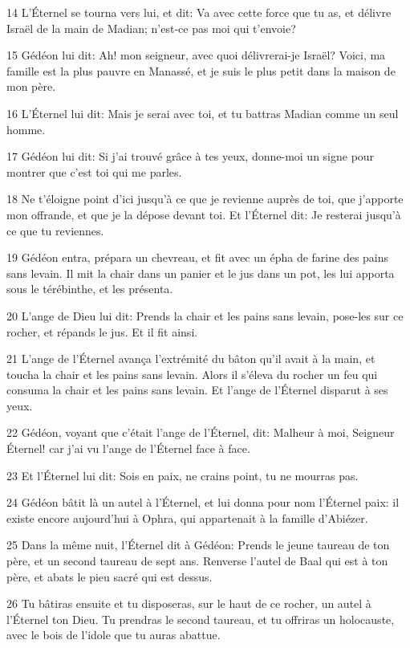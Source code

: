 \par 14 L'Éternel se tourna vers lui, et dit: Va avec cette force que tu as, et délivre Israël de la main de Madian; n'est-ce pas moi qui t'envoie?
\par 15 Gédéon lui dit: Ah! mon seigneur, avec quoi délivrerai-je Israël? Voici, ma famille est la plus pauvre en Manassé, et je suis le plus petit dans la maison de mon père.
\par 16 L'Éternel lui dit: Mais je serai avec toi, et tu battras Madian comme un seul homme.
\par 17 Gédéon lui dit: Si j'ai trouvé grâce à tes yeux, donne-moi un signe pour montrer que c'est toi qui me parles.
\par 18 Ne t'éloigne point d'ici jusqu'à ce que je revienne auprès de toi, que j'apporte mon offrande, et que je la dépose devant toi. Et l'Éternel dit: Je resterai jusqu'à ce que tu reviennes.
\par 19 Gédéon entra, prépara un chevreau, et fit avec un épha de farine des pains sans levain. Il mit la chair dans un panier et le jus dans un pot, les lui apporta sous le térébinthe, et les présenta.
\par 20 L'ange de Dieu lui dit: Prends la chair et les pains sans levain, pose-les sur ce rocher, et répands le jus. Et il fit ainsi.
\par 21 L'ange de l'Éternel avança l'extrémité du bâton qu'il avait à la main, et toucha la chair et les pains sans levain. Alors il s'éleva du rocher un feu qui consuma la chair et les pains sans levain. Et l'ange de l'Éternel disparut à ses yeux.
\par 22 Gédéon, voyant que c'était l'ange de l'Éternel, dit: Malheur à moi, Seigneur Éternel! car j'ai vu l'ange de l'Éternel face à face.
\par 23 Et l'Éternel lui dit: Sois en paix, ne crains point, tu ne mourras pas.
\par 24 Gédéon bâtit là un autel à l'Éternel, et lui donna pour nom l'Éternel paix: il existe encore aujourd'hui à Ophra, qui appartenait à la famille d'Abiézer.
\par 25 Dans la même nuit, l'Éternel dit à Gédéon: Prends le jeune taureau de ton père, et un second taureau de sept ans. Renverse l'autel de Baal qui est à ton père, et abats le pieu sacré qui est dessus.
\par 26 Tu bâtiras ensuite et tu disposeras, sur le haut de ce rocher, un autel à l'Éternel ton Dieu. Tu prendras le second taureau, et tu offriras un holocauste, avec le bois de l'idole que tu auras abattue.
